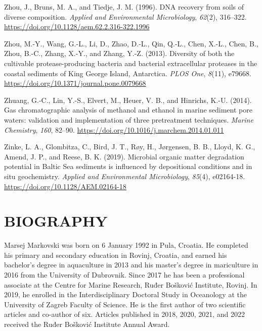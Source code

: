 \documentclass[
  12 pt,
]{book}
\newlength{\cslhangindent}
\newlength{\cslentryspacingunit} %
\newenvironment{CSLReferences}[2] %
 {%
  \setlength{\parindent}{0pt}
  \ifodd #1
  \let\oldpar\par
  \def\par{\hangindent=\cslhangindent\oldpar}
  \fi
  \setlength{\parskip}{#2\cslentryspacingunit}
 }%
 {}
\begin{document}
\begin{CSLReferences}{1}{0}
\leavevmode{}%
Zhou, J., Bruns, M. A., and Tiedje, J. M. (1996). {DNA} recovery from soils of diverse composition. \emph{Applied and Environmental Microbiology}, \emph{62}(2), 316--322. \url{https://doi.org/10.1128/aem.62.2.316-322.1996}

\leavevmode{}%
Zhou, M.-Y., Wang, G.-L., Li, D., Zhao, D.-L., Qin, Q.-L., Chen, X.-L., Chen, B., Zhou, B.-C., Zhang, X.-Y., and Zhang, Y.-Z. (2013). Diversity of both the cultivable protease-producing bacteria and bacterial extracellular proteases in the coastal sediments of {King George Island}, {Antarctica}. \emph{PLOS One}, \emph{8}(11), e79668. \url{https://doi.org/10.1371/journal.pone.0079668}

\leavevmode{}%
Zhuang, G.-C., Lin, Y.-S., Elvert, M., Heuer, V. B., and Hinrichs, K.-U. (2014). Gas chromatographic analysis of methanol and ethanol in marine sediment pore waters: validation and implementation of three pretreatment techniques. \emph{Marine Chemistry}, \emph{160}, 82--90. \url{https://doi.org/10.1016/j.marchem.2014.01.011}

\leavevmode{}%
Zinke, L. A., Glombitza, C., Bird, J. T., Røy, H., Jørgensen, B. B., Lloyd, K. G., Amend, J. P., and Reese, B. K. (2019). Microbial organic matter degradation potential in {Baltic Sea} sediments is influenced by depositional conditions and in situ geochemistry. \emph{Applied and Environmental Microbiology}, \emph{85}(4), e02164-18. \url{https://doi.org/10.1128/AEM.02164-18}

\end{CSLReferences}

\hypertarget{biography}{%
\chapter{BIOGRAPHY}\label{biography}}

Marsej Markovski was born on 6 January 1992 in Pula, Croatia. He completed his primary and secondary education in Rovinj, Croatia, and earned his bachelor's degree in aquaculture in 2013 and his master's degree in mariculture in 2016 from the University of Dubrovnik. Since 2017 he has been a professional associate at the Centre for Marine Research, Ruđer Bošković Institute, Rovinj. In 2019, he enrolled in the Interdisciplinary Doctoral Study in Oceanology at the University of Zagreb Faculty of Science. He is the first author of two scientific articles and co-author of six. Articles published in 2018, 2020, 2021, and 2022 received the Ruđer Bošković Institute Annual Award.
\end{document}
